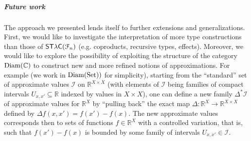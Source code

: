 \subparagraph*{Future work}


%
%
%
%
%
%
%
%
%

The approach we presented lends itself to further extensions and generalizations.
First, we would like to investigate the interpretation of more type constructions than those of $\mathsf{ST\lambda C}(\mathcal F_{n})$ (e.g. coproducts, recursive types, effects). Moreover, we would like to explore the possibility of exploiting the structure of the category $\operatorname{Diam}(\mathbb C)$ to construct new and more refined notions of approximations.
For example (we work in $\operatorname{Diam}(\operatorname{Set}))$ for simplicity), 
starting from the ``standard'' set of approximate values $\mathcal I$ on $\mathbb{R}^{X\times X}$ (with elements of $\mathcal I$ being  families of compact intervals $U_{x,x'}\subseteq \mathbb R$ indexed by values in $X\times X$), one can define a new family  $\Delta^{*}\mathcal I$  of approximate values for  $\mathbb R^{X}$ by ``pulling back'' the exact map 
$\Delta:
\mathbb R^{X} \to \mathbb R^{X\times X}$ defined by $\Delta f(x,x')=f(x')-f(x)$. 
The new approximate values corresponds then to sets of functions $f\in \mathbb R^{X}$ with a controlled variation, that is, such that $f(x')-f(x)$ is bounded by some family of intervals $U_{x,x'} \in \mathcal I$.





